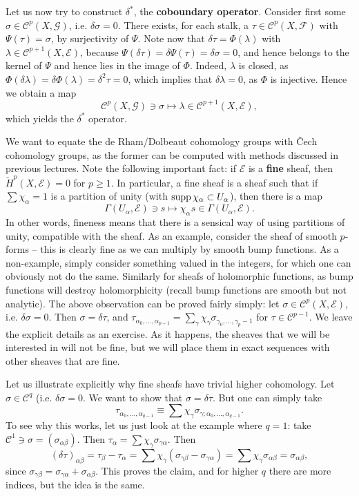 \documentclass{../mathnotes}
\begin{document}
Let us now try to construct $\delta^*$, the \textbf{coboundary operator}.
Consider first some $\sigma\in\mathcal{C}^p(X,\mathcal{G})$, i.e. $\delta\sigma=0$.
There exists, for each stalk, a $\tau\in \mathcal{C}^p(X,\mathcal{F})$ with $\Psi(\tau)=\sigma$,
by surjectivity of $\Psi$. Note now that $\delta\tau=\Phi(\lambda)$ with $\lambda\in\mathcal{C}^{p+1}(X,\mathcal{E})$,
because $\Psi(\delta\tau)=\delta\Psi(\tau)=\delta\sigma=0$, and hence belongs to the kernel of $\Psi$ and
hence lies in the image of $\Phi$. Indeed, $\lambda$ is closed, as $\Phi(\delta\lambda)=\delta\Phi(\lambda)=\delta^2\tau=0$,
which implies that $\delta\lambda=0$, as $\Phi$ is injective. Hence we obtain a map
\[\mathcal{C}^p(X,\mathcal{G})\ni\sigma\mapsto\lambda\in\mathcal{C}^{p+1}(X,\mathcal{E}),\]
which yields the $\delta^*$ operator.

We want to equate the de Rham/Dolbeaut cohomology groups with \v{C}ech cohomology groups, as the former
can be computed with methods discussed in previous lectures. Note the following important fact:
if $\mathcal{E}$ is a \textbf{fine} sheaf, then $\check H^p(X,\mathcal{E})=0$ for $p\geq 1$. In particular,
a fine sheaf is a sheaf such that if $\sum\chi_\alpha=1$ is a partition of unity (with $\operatorname{supp}\chi_\alpha\subset U_\alpha$),
then there is a map
\[\Gamma(U_\alpha,\mathcal{E})\ni s\mapsto \chi_\alpha s\in\Gamma(U_\alpha,\mathcal{E}).\]
In other words, fineness means that there is a sensical way of using partitions of unity,
compatible with the sheaf. As an example, consider the sheaf of smooth $p$-forms -- this is clearly fine
as we can multiply by smooth bump functions. As a non-example, simply consider something valued in the integers,
for which one can obviously not do the same. Similarly for sheafs of holomorphic functions, as
bump functions will destroy holomorphicity (recall bump functions are smooth but not analytic).
The above observation can be proved fairly simply: let $\sigma\in\mathcal{C}^p(X,\mathcal{E})$, i.e. $\delta\sigma=0$.
Then $\sigma=\delta\tau$, and $\tau_{\alpha_0,\ldots,\alpha_{p-1}}=\sum_\gamma\chi_\gamma\sigma_{\gamma_0,\ldots,\gamma_p-1}$
for $\tau\in\mathcal{C}^{p-1}$. We leave the explicit details as an exercise.
As it happens, the sheaves that we will be interested in will not be fine, but we will place them in exact sequences
with other sheaves that are fine.

Let us illustrate explicitly why fine sheafs have trivial higher cohomology. Let $\sigma\in\mathcal{C}^q$ (i.e. $\delta\sigma=0$.
We want to show that $\sigma=\delta\tau$. But one can simply take
\[\tau_{\alpha_0,\ldots,\alpha_{q-1}}\equiv\sum\chi_\gamma\sigma_{\gamma;\alpha_0,\ldots,\alpha_{q-1}}.\]
To see why this works, let us just look at the example where $q=1$: take $\mathcal{C}^1\ni\sigma=(\sigma_{\alpha\beta}).$
Then $\tau_\alpha=\sum\chi_\gamma\sigma_{\gamma\alpha}$. Then
\[(\delta\tau)_{\alpha\beta}=\tau_\beta-\tau_\alpha=\sum\chi_\gamma(\sigma_{\gamma\beta}-\sigma_{\gamma\alpha})=\sum\chi_\gamma\sigma_{\alpha\beta}=\sigma_{\alpha\beta},\]
since $\sigma_{\gamma\beta}=\sigma_{\gamma\alpha}+\sigma_{\alpha\beta}$. This proves the claim, and for higher $q$ there
are more indices, but the idea is the same.
\end{document}
